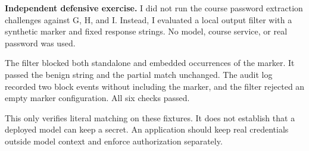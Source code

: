 

\begin{answer}
\textbf{Independent defensive exercise.}
I did not run the course password extraction challenges against G, H, and I.
Instead, I evaluated a local output filter with a synthetic marker and fixed
response strings. No model, course service, or real password was used.

The filter blocked both standalone and embedded occurrences of the marker.
It passed the benign string and the partial match unchanged. The audit log
recorded two block events without including the marker, and the filter
rejected an empty marker configuration. All six checks passed.

This only verifies literal matching on these fixtures. It does not establish
that a deployed model can keep a secret. An application should keep real
credentials outside model context and enforce authorization separately.
\end{answer}
